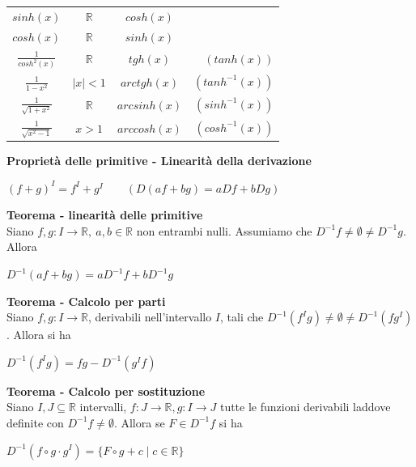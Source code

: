 \documentclass[12pt, a4paper]{article}
\begin{document}
\begin{center}
\begin{tabular}{c | c | c r}
            $sinh(x) $                          & $\mathbb{R} $                         & $cosh(x) $                      &                            \\
            $cosh(x)$                           & $\mathbb{R}$                          & $sinh(x) $                      &                            \\
            $\frac{1}{cosh^{2}(x)}$             & $\mathbb{R}$                          & $tgh(x)$                        & $(tanh(x))$                \\
            $\frac{1}{1-x^{2}}$                 & $|x|<1$                               & $arctgh(x)$                     & $(tanh^{-1}(x))$           \\
            $\frac{1}{\sqrt{1+x^{2}}}$          & $\mathbb{R}$                          & $arcsinh(x)$                    & $(sinh^{-1}(x))$           \\
            $\frac{1}{\sqrt{x^{2}-1}}$          & $x>1$                                 & $arccosh(x)$                    & $(cosh^{-1}(x))$           \\
        \end{tabular}
    \end{center}

    \textbf{Proprietà delle primitive - Linearità della derivazione}
    \begin{center}
        $(f+g)^{I}=f^{I}+g^{I}\qquad(D(af+bg)=aDf+bDg)$
    \end{center}

    \textbf{Teorema - linearità delle primitive}\\Siano $f,g:I\to\mathbb{R},\ a,b\in\mathbb{R}$ non entrambi nulli.
    Assumiamo che $D^{-1}f\neq\emptyset\neq D^{-1}g$. Allora
    \begin{center}
        $D^{-1}(af+bg)=aD^{-1}f+bD^{-1}g$
    \end{center}

    \textbf{Teorema - Calcolo per parti}\\Siano $f,g:I\to\mathbb{R}$, derivabili nell'intervallo $I$, tali che
$D^{-1}(f^{I}g)\neq\emptyset\neq D^{-1}(fg^{I})$. Allora si ha
    \begin{center}
        $D^{-1}(f^{I}g)=fg-D^{-1}(g^{I}f)$
    \end{center}

    \textbf{Teorema - Calcolo per sostituzione}\\Siano $I,J\subseteq\mathbb{R}$ intervalli, $f:J\to\mathbb{R},
g:I\to J$ tutte le funzioni derivabili laddove definite con $D^{-1}f\neq\emptyset$. Allora se $F\in D^{-1}f$
    si ha
    \begin{center}
        $D^{-1}(f\circ g\cdot g^{I})=\{F\circ g+c\mid c\in\mathbb{R}\}$
    \end{center}
\end{document}
